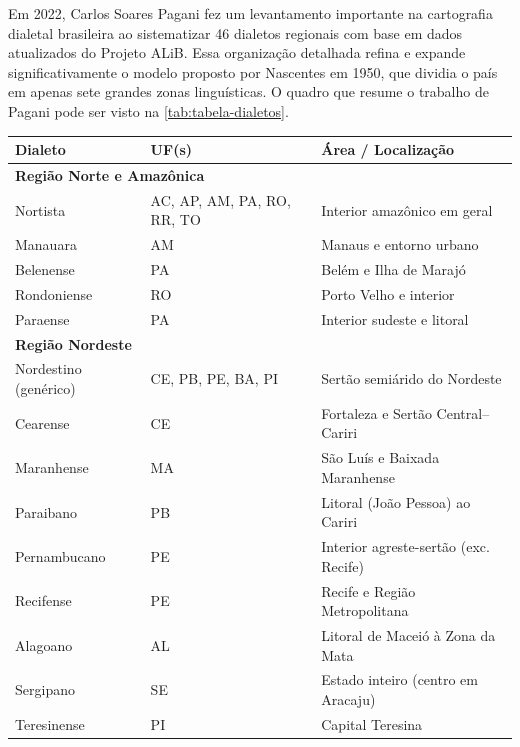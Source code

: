 Em 2022, Carlos Soares Pagani \cite{pagani2022} fez um levantamento importante na cartografia dialetal brasileira ao sistematizar 46 dialetos regionais com base em dados atualizados do Projeto ALiB. Essa organização detalhada refina e expande significativamente o modelo proposto por Nascentes em 1950, que dividia o país em apenas sete grandes zonas linguísticas. 
O quadro que resume o trabalho de Pagani pode ser visto na \autoref{tab:tabela-dialetos}.

 
\begin{table}[ht]
\centering
\tiny
\setlength{\tabcolsep}{6pt}
\begin{tabular}{lll}
\hline
\textbf{Dialeto} & \textbf{UF(s)} & \textbf{Área / Localização} \\
\hline
\multicolumn{3}{l}{

\textbf{Região Norte e Amazônica}} \\ \hline
Nortista    & AC, AP, AM, PA, RO, RR, TO & Interior amazônico em geral \\
Manauara    & AM                         & Manaus e entorno urbano     \\
Belenense   & PA                         & Belém e Ilha de Marajó      \\
Rondoniense & RO                         & Porto Velho e interior      \\
Paraense    & PA                         & Interior sudeste e litoral  \\
\hline
\multicolumn{3}{l}{\textbf{Região Nordeste}} \\ \hline
Nordestino (genérico) & CE, PB, PE, BA, PI & Sertão semiárido do Nordeste       \\
Cearense              & CE                  & Fortaleza e Sertão Central–Cariri  \\
Maranhense            & MA                  & São Luís e Baixada Maranhense     \\
Paraibano             & PB                  & Litoral (João Pessoa) ao Cariri    \\
Pernambucano          & PE                  & Interior agreste-sertão (exc. Recife) \\
Recifense             & PE                  & Recife e Região Metropolitana      \\
Alagoano              & AL                  & Litoral de Maceió à Zona da Mata   \\
Sergipano             & SE                  & Estado inteiro (centro em Aracaju) \\
Teresinense           & PI                  & Capital Teresina                   \\

\end{tabular}
\end{table}
